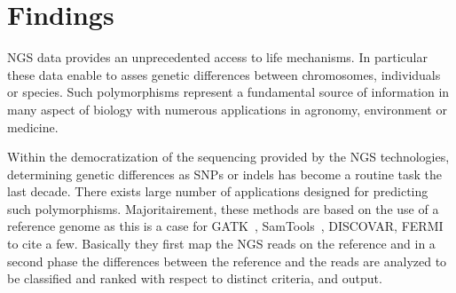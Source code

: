 \documentclass{bmcart}
\begin{document}
\begin{frontmatter}
\begin{abstractbox}
\begin{keyword}
\end{keyword}


\end{abstractbox}
%

\end{frontmatter}




\section*{Findings}

NGS data provides an unprecedented access to life mechanisms. In particular these data enable to asses genetic differences between chromosomes, individuals or species. 
Such polymorphisms represent a fundamental source of information in many aspect of biology with numerous applications in agronomy, environment or medicine. 


Within the democratization of the sequencing provided by the NGS technologies, determining genetic differences as SNPs or indels has become a routine task the last decade. There exists large number of applications designed for predicting such polymorphisms. Majoritairement, these methods are based on the use of a reference genome as this is a case for GATK~\cite{}, SamTools~\cite{}, DISCOVAR, FERMI~\cite{} to cite a few. Basically they first map the NGS reads on the reference and in a second phase the differences between the reference and the reads are analyzed to be classified and ranked with respect to distinct criteria, and output. 
\end{document}
